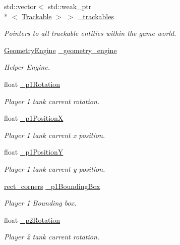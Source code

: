 \begin{DoxyCompactItemize}
\item 
std\-::vector$<$ std\-::weak\-\_\-ptr\\*
$<$ \hyperlink{classTrackable}{Trackable} $>$ $>$ \hyperlink{classTrackingManager_add21c42cf5a993fbf5a95abd7e36f3dc}{\-\_\-trackables}
\begin{DoxyCompactList}\small\item\em Pointers to all trackable entities within the game world. \end{DoxyCompactList}\item 
\hyperlink{classGeometryEngine}{Geometry\-Engine} \hyperlink{classTrackingManager_a9bf3e308977ec91b61c7bf5d269f35dd}{\-\_\-geometry\-\_\-engine}
\begin{DoxyCompactList}\small\item\em Helper Engine. \end{DoxyCompactList}\item 
float \hyperlink{classTrackingManager_a8c7de22662c27124fac80902d4f8ba41}{\-\_\-p1\-Rotation}
\begin{DoxyCompactList}\small\item\em Player 1 tank current rotation. \end{DoxyCompactList}\item 
float \hyperlink{classTrackingManager_a14b43a5e0cd605fff6b3308d0377f697}{\-\_\-p1\-Position\-X}
\begin{DoxyCompactList}\small\item\em Player 1 tank current x position. \end{DoxyCompactList}\item 
float \hyperlink{classTrackingManager_aa5b384a370b1ddccf76badc8a55459b1}{\-\_\-p1\-Position\-Y}
\begin{DoxyCompactList}\small\item\em Player 1 tank current y position. \end{DoxyCompactList}\item 
\hyperlink{structrect__corners}{rect\-\_\-corners} \hyperlink{classTrackingManager_a4916085aebb34a3921f3592d7ae07767}{\-\_\-p1\-Bounding\-Box}
\begin{DoxyCompactList}\small\item\em Player 1 Bounding box. \end{DoxyCompactList}\item 
float \hyperlink{classTrackingManager_a04442a7d5e399370637c9e334a257eb6}{\-\_\-p2\-Rotation}
\begin{DoxyCompactList}\small\item\em Player 2 tank current rotation. \end{DoxyCompactList}\item 

\end{DoxyCompactItemize}
